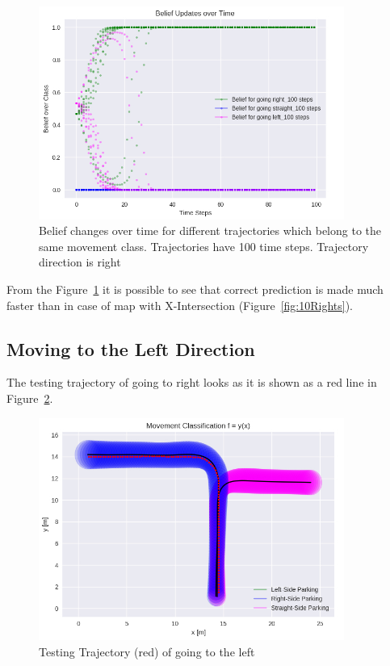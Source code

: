 \begin{figure}[h]
	\centering  	
	\includegraphics[width=10cm]{img/10Rights_T.jpg}
	\caption{Belief changes over time for different trajectories which belong to the same movement class. Trajectories have 100 time steps. Trajectory direction is right}
	\label{fig:10RightsT}    
\end{figure}

From the Figure~\ref{fig:10RightsT} it is possible to see that correct prediction is made much faster than in case of map with X-Intersection (Figure~\ref{fig:10Rights}).

\subsection{Moving to the Left Direction}

The testing trajectory of going to right looks as it is shown as a red line in Figure~\ref{fig:left_T}.

\begin{figure}[h]
	\centering  	
	\includegraphics[width=10cm]{img/left_org_T.jpg}
	\caption{Testing Trajectory (red) of going to the left}
	\label{fig:left_T}    
\end{figure}

